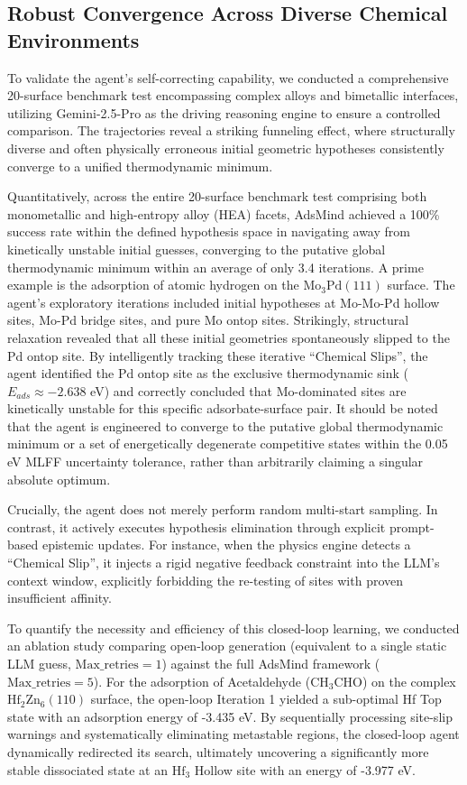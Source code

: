 \documentclass{article}
\begin{document}
\subsection{Robust Convergence Across Diverse Chemical Environments}
To validate the agent's self-correcting capability, we conducted a comprehensive 20-surface benchmark test encompassing complex alloys and bimetallic interfaces, utilizing Gemini-2.5-Pro as the driving reasoning engine to ensure a controlled comparison. The trajectories reveal a striking funneling effect, where structurally diverse and often physically erroneous initial geometric hypotheses consistently converge to a unified thermodynamic minimum.

Quantitatively, across the entire 20-surface benchmark test comprising both monometallic and high-entropy alloy (HEA) facets, AdsMind achieved a 100\% success rate within the defined hypothesis space in navigating away from kinetically unstable initial guesses, converging to the putative global thermodynamic minimum within an average of only 3.4 iterations. A prime example is the adsorption of atomic hydrogen on the $\text{Mo}_{3}\text{Pd}(111)$ surface. The agent's exploratory iterations included initial hypotheses at Mo-Mo-Pd hollow sites, Mo-Pd bridge sites, and pure Mo ontop sites. Strikingly, structural relaxation revealed that all these initial geometries spontaneously slipped to the Pd ontop site. By intelligently tracking these iterative ``Chemical Slips'', the agent identified the Pd ontop site as the exclusive thermodynamic sink ($E_{ads} \approx -2.638$ eV) and correctly concluded that Mo-dominated sites are kinetically unstable for this specific adsorbate-surface pair. It should be noted that the agent is engineered to converge to the putative global thermodynamic minimum or a set of energetically degenerate competitive states within the 0.05 eV MLFF uncertainty tolerance, rather than arbitrarily claiming a singular absolute optimum.

Crucially, the agent does not merely perform random multi-start sampling. In contrast, it actively executes hypothesis elimination through explicit prompt-based epistemic updates. For instance, when the physics engine detects a ``Chemical Slip'', it injects a rigid negative feedback constraint into the LLM's context window, explicitly forbidding the re-testing of sites with proven insufficient affinity.

To quantify the necessity and efficiency of this closed-loop learning, we conducted an ablation study comparing open-loop generation (equivalent to a single static LLM guess, $\text{Max\_retries} = 1$) against the full AdsMind framework ($\text{Max\_retries} = 5$). For the adsorption of Acetaldehyde ($\text{CH}_{3}\text{CHO}$) on the complex $\text{Hf}_{2}\text{Zn}_{6}(110)$ surface, the open-loop Iteration 1 yielded a sub-optimal Hf Top state with an adsorption energy of -3.435 eV. By sequentially processing site-slip warnings and systematically eliminating metastable regions, the closed-loop agent dynamically redirected its search, ultimately uncovering a significantly more stable dissociated state at an $\text{Hf}_{3}$ Hollow site with an energy of -3.977 eV.
\end{document}
